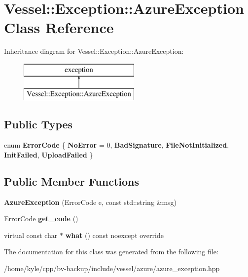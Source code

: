 \hypertarget{class_vessel_1_1_exception_1_1_azure_exception}{}\section{Vessel\+:\+:Exception\+:\+:Azure\+Exception Class Reference}
\label{class_vessel_1_1_exception_1_1_azure_exception}
Inheritance diagram for Vessel\+:\+:Exception\+:\+:Azure\+Exception\+:\begin{figure}[H]
\begin{center}
\leavevmode
\includegraphics[height=2.000000cm]{class_vessel_1_1_exception_1_1_azure_exception}
\end{center}
\end{figure}
\subsection*{Public Types}
\begin{DoxyCompactItemize}
\item 
\mbox{\label{class_vessel_1_1_exception_1_1_azure_exception_a824c85ca9572c0196f1abd738b951d5d}} 
enum {\bfseries Error\+Code} \{ \newline
{\bfseries No\+Error} = 0, 
{\bfseries Bad\+Signature}, 
{\bfseries File\+Not\+Initialized}, 
{\bfseries Init\+Failed}, 
\newline
{\bfseries Upload\+Failed}
 \}
\end{DoxyCompactItemize}
\subsection*{Public Member Functions}
\begin{DoxyCompactItemize}
\item 
\mbox{\label{class_vessel_1_1_exception_1_1_azure_exception_ab6773659cc1d95e693f98ad820029a14}} 
{\bfseries Azure\+Exception} (Error\+Code e, const std\+::string \&msg)
\item 
\mbox{\label{class_vessel_1_1_exception_1_1_azure_exception_a73647882382d7e52aa42b04bf07afa25}} 
Error\+Code {\bfseries get\+\_\+code} ()
\item 
\mbox{\label{class_vessel_1_1_exception_1_1_azure_exception_a943727ae14ef986550dde9d775ba48d7}} 
virtual const char $\ast$ {\bfseries what} () const noexcept override
\end{DoxyCompactItemize}


The documentation for this class was generated from the following file\+:\begin{DoxyCompactItemize}
\item 
/home/kyle/cpp/bv-\/backup/include/vessel/azure/azure\+\_\+exception.\+hpp\end{DoxyCompactItemize}
